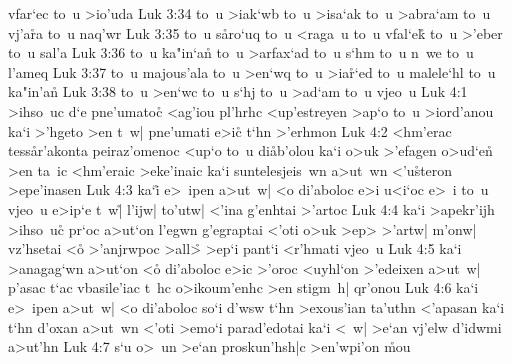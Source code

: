 vfar`ec
to~u
>io'uda\bibvsend
\vs Luk 3:34
to~u
>iak`wb
to~u
>isa`ak
to~u
>abra`am
to~u
vj'a\r{r}a
to~u
naq'wr\bibvsend
\vs Luk 3:35
to~u
s\r{a}ro`uq
to~u
<raga~u
to~u
vfal`e\r{k}
to~u
>'eber
to~u
sal'a\bibvsend
\vs Luk 3:36
to~u
ka"in`a\r{n}
to~u
>arfax`ad
to~u
s`hm
to~u
n~we
to~u
l'ameq\bibvsend
\vs Luk 3:37
to~u
majous'ala
to~u
>en`wq
to~u
>ia\r{r}`ed
to~u
malele`hl
to~u
ka"in'a\r{n}\bibvsend
{}
\vs Luk 3:38
to~u
>en`wc
to~u
s`hj
to~u
>ad`am
to~u
vjeo~u\bibvsend
\vs Luk 4:1
>ihso~uc
d`e
pne'umatoc\r{}
<ag'iou
pl'hrhc
<up'estreyen
>ap`o
to~u
>iord'anou
ka`i
>'hgeto
>en
t~w|
pne'umati
e>ic\r{}
t`hn
>'erhmon\bibvsend
\vs Luk 4:2
<hm'e\-rac
tes\-s\r{a}\-r'a\-kon\-ta
peiraz'omenoc
<up`o
to~u
di\r{a}b'olou
ka`i
o>uk
>'efagen
o>ud`e\r{n}
>en
ta~ic
<hm'eraic
>eke'inaic
ka`i
suntelesjeis~wn
a>ut~wn
<'u\r{s}teron
>epe'inasen\bibvsend
\vs Luk 4:3
ka`i\r{}
e>~ipen
a>ut~w|
<o
di'aboloc
e>i
u<i`oc
e>~i
to~u
vjeo~u
e>ip`e
t~w|\r{}
l'ijw|
to'utw|
<'ina
g'enhtai
>'artoc\bibvsend
\vs Luk 4:4
ka`i
>apekr'ijh
>ihso~uc\r{}
pr`oc
a>ut`on
l'egwn
g'egraptai
<'oti
o>uk
>ep>
>'artw|
m'onw|
vz'hsetai
<o\r{}
>'anjrwpoc
>all>\r{}
>ep`i
pant`i
<r'hmati
vjeo~u\bibvsend
\vs Luk 4:5
ka`i
>anagag`wn
a>ut`on
<o\r{}
di'aboloc
e>ic
>'oroc
<uyhl`on
>'edeixen
a>ut~w|
p'asac
t`ac
vbasile'iac
t~hc
o>ikoum'enhc
>en
stigm~h|
qr'onou\bibvsend
\vs Luk 4:6
ka`i
e>~ipen
a>ut~w|
<o
di'aboloc
so`i
d'wsw
t`hn
>exous'ian
ta'uthn
<'apasan
ka`i
t`hn
d'oxan
a>ut~wn
<'oti
>emo`i
parad'edotai
ka`i
<~w|
>e`an
vj'elw
d'idwmi
a>ut'hn\bibvsend
\vs Luk 4:7
s`u
o>~un
>e`an
proskun'hsh|c
>en'wpi'on
\r{m}ou
